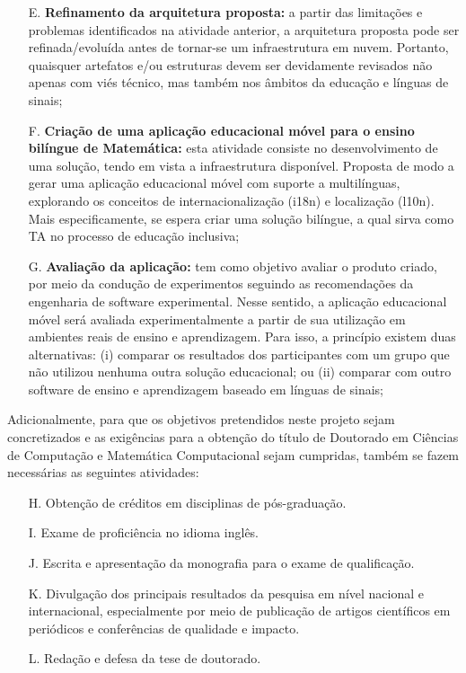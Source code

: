 \begin{enumerate}
    \item [E.]\textbf{Refinamento da arquitetura proposta:} a partir das limitações e problemas identificados na atividade anterior, a arquitetura proposta pode ser refinada/evoluída antes de tornar-se um infraestrutura em nuvem. Portanto, quaisquer artefatos e/ou estruturas devem ser devidamente revisados não apenas com viés técnico, mas também nos âmbitos da educação e línguas de sinais;
    
    \item [F.]\textbf{Criação de uma aplicação educacional móvel para o ensino bilíngue de Matemática:} esta atividade consiste no desenvolvimento de uma solução, tendo em vista a infraestrutura disponível. Proposta de modo a gerar uma aplicação educacional móvel com suporte a multilínguas, explorando os conceitos de internacionalização (i18n) e localização (l10n). Mais especificamente, se espera criar uma solução bilíngue, a qual sirva como TA no processo de educação inclusiva;
    
    \item [G.]\textbf{Avaliação da aplicação:} tem como objetivo avaliar o produto criado, por meio da condução de experimentos seguindo as recomendações da engenharia de software experimental. Nesse sentido, a aplicação educacional móvel será avaliada experimentalmente a partir de sua utilização em ambientes reais de ensino e aprendizagem. Para isso, a princípio existem duas alternativas: (i) comparar os resultados dos participantes com um grupo que não utilizou nenhuma outra solução educacional; ou (ii) comparar com outro software de ensino e aprendizagem baseado em línguas de sinais;
    
\end{enumerate}

Adicionalmente, para que os objetivos pretendidos neste projeto sejam concretizados e as exigências para a obtenção do título de Doutorado em Ciências de Computação e Matemática Computacional sejam cumpridas, também se fazem necessárias as seguintes atividades:

\begin{enumerate}
    \item[H.] Obtenção de créditos em disciplinas de pós-graduação. 
    \item[I.] Exame de proficiência no idioma inglês.
    \item[J.] Escrita e apresentação da monografia para o exame de qualificação.
    \item[K.] Divulgação dos principais resultados da pesquisa em nível nacional e internacional, especialmente por meio de publicação de artigos científicos em periódicos e conferências de qualidade e impacto.
    \item[L.] Redação e defesa da tese de doutorado.
\end{enumerate}

